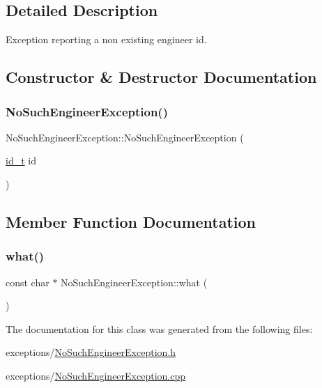 \subsection{Detailed Description}
Exception reporting a non existing engineer id. 

\subsection{Constructor \& Destructor Documentation}
\mbox{\label{classNoSuchEngineerException_acb7d95771ea1961a2cf223d3fcedd78a}} 
\subsubsection{\texorpdfstring{No\+Such\+Engineer\+Exception()}{NoSuchEngineerException()}}
{\footnotesize\ttfamily No\+Such\+Engineer\+Exception\+::\+No\+Such\+Engineer\+Exception (\begin{DoxyParamCaption}\item[{\mbox{\hyperlink{project__utils_8h_a8f3a969054ad2200720b96e7e23dd4e1}{id\+\_\+t}}}]{id }\end{DoxyParamCaption})\hspace{0.3cm}{\ttfamily [explicit]}}



\subsection{Member Function Documentation}
\mbox{\label{classNoSuchEngineerException_a8d08bc83799855bed5d9ba2fddb56b34}} 
\subsubsection{\texorpdfstring{what()}{what()}}
{\footnotesize\ttfamily const char $\ast$ No\+Such\+Engineer\+Exception\+::what (\begin{DoxyParamCaption}{ }\end{DoxyParamCaption})}



The documentation for this class was generated from the following files\+:\begin{DoxyCompactItemize}
\item 
exceptions/\mbox{\hyperlink{NoSuchEngineerException_8h}{No\+Such\+Engineer\+Exception.\+h}}\item 
exceptions/\mbox{\hyperlink{NoSuchEngineerException_8cpp}{No\+Such\+Engineer\+Exception.\+cpp}}\end{DoxyCompactItemize}
